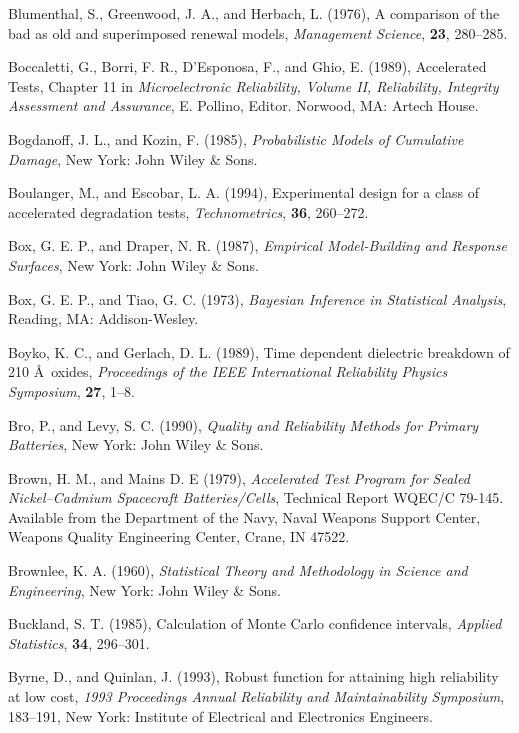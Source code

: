 \begin{thebibliography}{999}
Blumenthal, S., Greenwood, J. A., and Herbach, L. (1976),
A comparison of the bad as old and superimposed renewal models,
{\em Management Science}, {\bf 23}, 280--285.


Boccaletti, G., Borri, F. R., D'Esponosa, F., and Ghio, E.
(1989), Accelerated Tests, Chapter 11 in {\em Microelectronic
Reliability, Volume II, Reliability, Integrity Assessment and
Assurance}, E. Pollino, Editor.  Norwood, MA: Artech House.

Bogdanoff, J. L., and Kozin, F. (1985), {\em Probabilistic Models of
Cumulative Damage}, New York: John Wiley \& Sons.

Boulanger, M., and Escobar, L. A. (1994), Experimental design for a
class of accelerated degradation tests,  {\em Technometrics}, {\bf 36},
260--272.

Box, G. E. P., and Draper, N. R. (1987), {\em Empirical Model-Building and
Response Surfaces}, New York: John Wiley \& Sons.

Box, G. E. P., and Tiao, G. C. (1973), {\em Bayesian Inference in
Statistical Analysis}, Reading, MA: Addison-Wesley.

Boyko, K. C., and Gerlach, D. L. (1989), Time dependent dielectric
breakdown of 210 \AA~oxides, {\em Proceedings of the IEEE International
Reliability Physics Symposium}, {\bf 27}, 1--8.

Bro, P., and Levy, S. C. (1990), {\em Quality and Reliability Methods
for Primary Batteries}, New York: John Wiley \& Sons.

Brown, H. M., and Mains D. E (1979), {\em Accelerated Test Program for
Sealed Nickel--Cadmium Spacecraft Batteries/Cells},
Technical Report WQEC/C 79-145. Available from the Department of the
Navy, Naval Weapons Support Center, Weapons Quality Engineering
Center, Crane, IN 47522.

Brownlee, K. A. (1960), {\em Statistical Theory and Methodology in
Science and Engineering}, New York: John Wiley \& Sons.


Buckland, S. T. (1985), Calculation of Monte Carlo confidence intervals,
{\em Applied Statistics}, {\bf 34}, 296--301.

Byrne, D., and Quinlan, J. (1993), Robust function for attaining high
reliability at low cost, {\em 1993 Proceedings Annual Reliability and
Maintainability Symposium}, 183--191, New York: Institute of
Electrical and Electronics Engineers.


\end{thebibliography}
